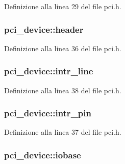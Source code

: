 Definizione alla linea 29 del file pci.\+h.

\hypertarget{structpci__device_ad68a4bddbd8fa989a866dccdd5035842}{
\subsubsection[{header}]{ pci\+\_\+device\+::header}}\label{structpci__device_ad68a4bddbd8fa989a866dccdd5035842}


Definizione alla linea 36 del file pci.\+h.

\hypertarget{structpci__device_a6d2298c5255e65c908f6dfdb29e4fcaf}{
\subsubsection[{intr\+\_\+line}]{ pci\+\_\+device\+::intr\+\_\+line}}\label{structpci__device_a6d2298c5255e65c908f6dfdb29e4fcaf}


Definizione alla linea 38 del file pci.\+h.

\hypertarget{structpci__device_a3645d371b3c45455414e4f8414e9eed8}{
\subsubsection[{intr\+\_\+pin}]{ pci\+\_\+device\+::intr\+\_\+pin}}\label{structpci__device_a3645d371b3c45455414e4f8414e9eed8}


Definizione alla linea 37 del file pci.\+h.

\hypertarget{structpci__device_a5b15ddf1741aaae55aa9933f53876d11}{
\subsubsection[{iobase}]{ pci\+\_\+device\+::iobase}}\label{structpci__device_a5b15ddf1741aaae55aa9933f53876d11}


